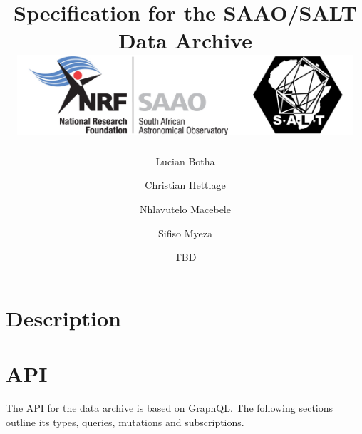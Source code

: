\documentclass[12pt]{article}
\begin{document}
\title[SAAO/SALT Data Archive]{Specification for the SAAO/SALT Data Archive\\[2em]\includegraphics[width=14cm,height=3cm,keepaspectratio]{SAAO_SALT_Logos.png}\\[2em]}

\author[Lucian Botha et al.]{Lucian Botha \and Christian Hettlage \and Nhlavutelo Macebele \and Sifiso Myeza}

\date{TBD}


\maketitle

\newpage

\section{Description}

\section{API}

The API for the data archive is based on GraphQL. The following sections outline its types, queries, mutations and subscriptions.

\label{lastpage}
\end{document}
